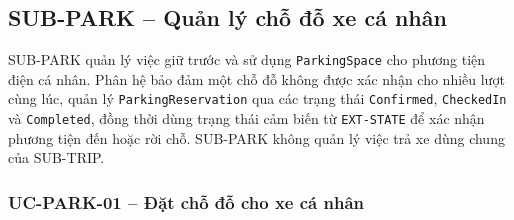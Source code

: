 \subsection{SUB-PARK -- Quản lý chỗ đỗ xe cá nhân}

SUB-PARK quản lý việc giữ trước và sử dụng \texttt{ParkingSpace} cho phương tiện điện cá nhân. Phân hệ bảo đảm một chỗ đỗ không được xác nhận cho nhiều lượt cùng lúc, quản lý \texttt{ParkingReservation} qua các trạng thái \texttt{Confirmed}, \texttt{CheckedIn} và \texttt{Completed}, đồng thời dùng trạng thái cảm biến từ \texttt{EXT-STATE} để xác nhận phương tiện đến hoặc rời chỗ. SUB-PARK không quản lý việc trả xe dùng chung của SUB-TRIP.

\subsubsection{UC-PARK-01 -- Đặt chỗ đỗ cho xe cá nhân}


